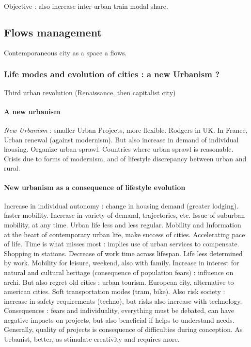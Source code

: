 Objective : also increase inter-urban train modal share.





\subsection{Flows management}

Contemporaneous city as a space a flows.

\subsubsection{Life modes and evolution of cities : a new Urbanism ?}

Third urban revolution (Renaissance, then capitalist city)

\paragraph{A new urbanism}

\textit{New Urbanism} : smaller Urban Projects, more flexible. Rodgers in UK. In France, Urban renewal (against modernism). But also increase in demand of individual housing. Organize urban sprawl. Countries where urban sprawl is reasonable. Crisis due to forms of modernism, and of lifestyle discrepancy between urban and rural.

\paragraph{New urbanism as a consequence of lifestyle evolution}

Increase in individual autonomy : change in housing demand (greater lodging). faster mobility. Increase in variety of demand, trajectories, etc. Issue of suburban mobility, at any time. Urban life less and less regular. Mobility and Information at the heart of contemporary urban life, make success of cities. Accelerating pace of life. Time is what misses most : implies use of urban services to compensate. Shopping in stations. Decrease of work time across lifespan. Life less determined by work. Mobility for leisure, weekend, also with family. Increase in interest for natural and cultural heritage (consequence of population fears) : influence on archi. But also regret old cities : urban tourism. European city, alternative to american cities. Soft transportation modes (tram, bike). Also risk society : increase in safety requirements (techno), but risks also increase with technology. Consequences : fears and individuality, everything must be debated, can have negative impacts on projects, but also beneficial if helps to understand needs. Generally, quality of projects is consequence of difficulties during conception. As Urbanist, better, as stimulate creativity and requires more.


